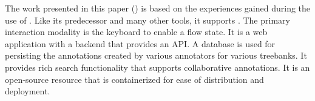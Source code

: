 The work presented in this paper (\boatvtwo) is based on the experiences gained during the use of \boatvone.
Like its predecessor and many other tools, it supports \ud.
The primary interaction modality is the keyboard to enable a flow state.
It is a web application with a backend that provides an API.
A database is used for persisting the annotations created by various annotators for various treebanks.
It provides rich search functionality that supports collaborative annotations.
It is an open-source resource that is containerized for ease of distribution and deployment.
